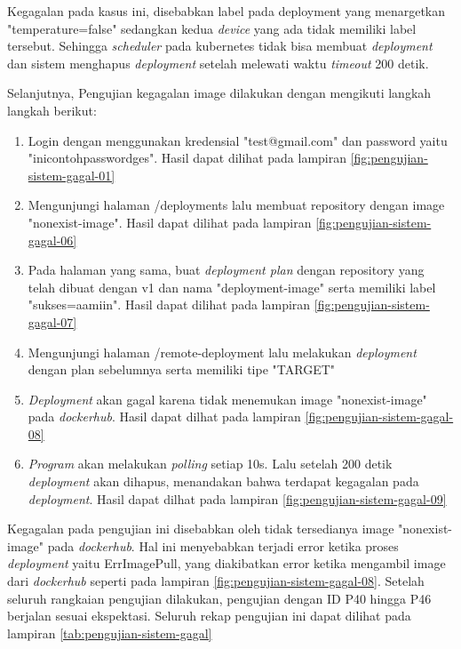 Kegagalan pada kasus ini, disebabkan label pada deployment yang menargetkan "temperature=false" sedangkan kedua \textit{device} yang ada tidak memiliki label tersebut. Sehingga \textit{scheduler} pada kubernetes tidak bisa membuat \textit{deployment} dan sistem menghapus \textit{deployment} setelah melewati waktu \textit{timeout} 200 detik.

Selanjutnya, Pengujian kegagalan image dilakukan dengan mengikuti langkah langkah berikut:

\begin{enumerate}
  \item Login dengan menggunakan kredensial "test@gmail.com" dan password yaitu "inicontohpasswordges". Hasil dapat dilihat pada lampiran \ref{fig:pengujian-sistem-gagal-01}
  \item Mengunjungi halaman /deployments lalu membuat repository dengan image "nonexist-image". Hasil dapat dilihat pada lampiran \ref{fig:pengujian-sistem-gagal-06}
  \item Pada halaman yang sama, buat \textit{deployment plan} dengan repository yang telah dibuat dengan v1 dan nama "deployment-image" serta memiliki label "sukses=aamiin". Hasil dapat dilihat pada lampiran \ref{fig:pengujian-sistem-gagal-07}
  \item Mengunjungi halaman /remote-deployment lalu melakukan \textit{deployment} dengan plan sebelumnya serta memiliki tipe "TARGET"
  \item \textit{Deployment} akan gagal karena tidak menemukan image "nonexist-image" pada \textit{dockerhub}. Hasil dapat dilhat pada lampiran \ref{fig:pengujian-sistem-gagal-08}
  \item \textit{Program} akan melakukan \textit{polling} setiap 10s. Lalu setelah 200 detik \textit{deployment} akan dihapus, menandakan bahwa terdapat kegagalan pada \textit{deployment}. Hasil dapat dilhat pada lampiran \ref{fig:pengujian-sistem-gagal-09}
\end{enumerate}

Kegagalan pada pengujian ini disebabkan oleh tidak tersedianya image "nonexist-image" pada \textit{dockerhub}. Hal ini menyebabkan terjadi error ketika proses \textit{deployment} yaitu ErrImagePull, yang diakibatkan error ketika mengambil image dari \textit{dockerhub} seperti pada lampiran \ref{fig:pengujian-sistem-gagal-08}. Setelah seluruh rangkaian pengujian dilakukan, pengujian dengan ID P40 hingga P46 berjalan sesuai ekspektasi. Seluruh rekap pengujian ini dapat dilihat pada lampiran \ref{tab:pengujian-sistem-gagal}